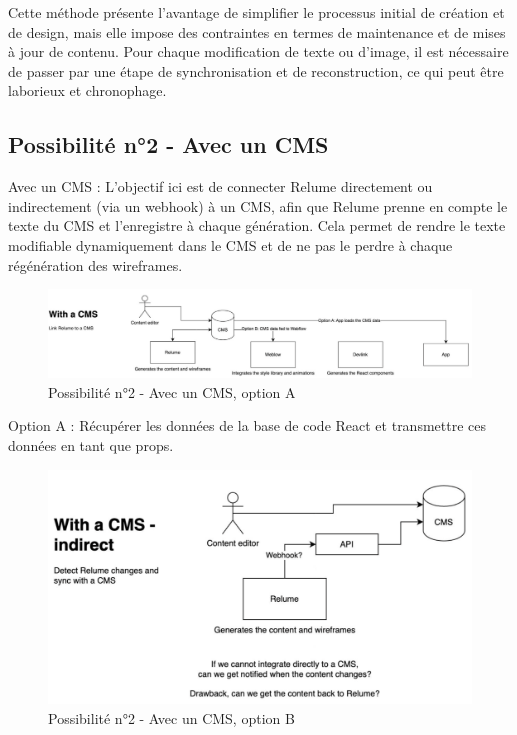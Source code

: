Cette méthode présente l'avantage de simplifier le processus initial de création et de design, mais elle impose des contraintes en termes de maintenance et de mises à jour de contenu. Pour chaque modification de texte ou d'image, il est nécessaire de passer par une étape de synchronisation et de reconstruction, ce qui peut être laborieux et chronophage.

\subsection{Possibilité n°2 - Avec un CMS}

Avec un CMS : L'objectif ici est de connecter Relume directement ou indirectement (via un webhook) à un CMS, afin que Relume prenne en compte le texte du CMS et l'enregistre à chaque génération. Cela permet de rendre le texte modifiable dynamiquement dans le CMS et de ne pas le perdre à chaque régénération des wireframes.

\begin{figure}[h] 
  \centering
  \includegraphics[width=1\textwidth]{Includes/Images/connection2.png}
  \caption{Possibilité n°2 - Avec un CMS, option A}
  \label{fig: Possibilité n°2 - Avec un CMS, option A}
\end{figure} 

Option A : Récupérer les données de la base de code React et transmettre ces données en tant que props.

\begin{figure}[h] 
  \centering
  \includegraphics[width=1\textwidth]{Includes/Images/connection3.png}
  \caption{Possibilité n°2 - Avec un CMS, option B}
  \label{fig: Possibilité n°2 - Avec un CMS, option B}
\end{figure} 


